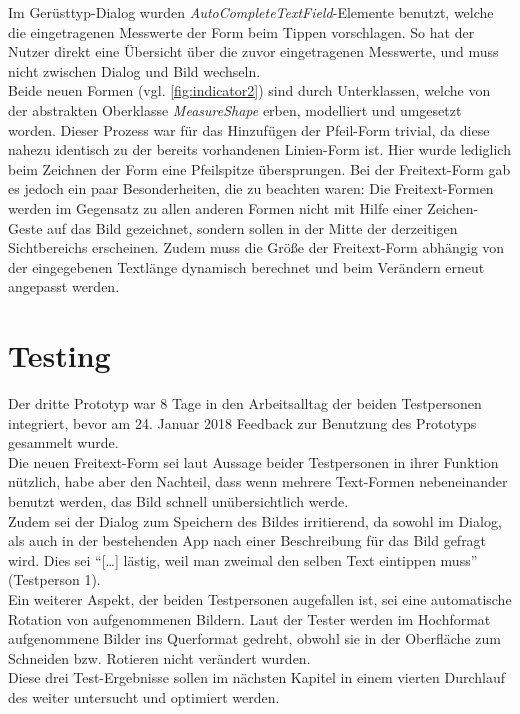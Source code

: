 Im Gerüsttyp-Dialog wurden \emph{AutoCompleteTextField}-Elemente benutzt, welche die eingetragenen Messwerte der Form beim Tippen vorschlagen.
So hat der Nutzer direkt eine Übersicht über die zuvor eingetragenen Messwerte, und muss nicht zwischen Dialog und Bild wechseln. \\

Beide neuen Formen (vgl. \autoref{fig:indicator2}) sind durch Unterklassen, welche von der abstrakten Oberklasse \emph{MeasureShape} erben, modelliert und umgesetzt worden.
Dieser Prozess war für das Hinzufügen der Pfeil-Form trivial, da diese nahezu identisch zu der bereits vorhandenen Linien-Form ist.
Hier wurde lediglich beim Zeichnen der Form eine Pfeilspitze übersprungen.
Bei der Freitext-Form gab es jedoch ein paar Besonderheiten, die zu beachten waren:
Die Freitext-Formen werden im Gegensatz zu allen anderen Formen nicht mit Hilfe einer Zeichen-Geste auf das Bild gezeichnet, sondern sollen in der Mitte der derzeitigen Sichtbereichs erscheinen.
Zudem muss die Größe der Freitext-Form abhängig von der eingegebenen Textlänge dynamisch berechnet und beim Verändern erneut angepasst werden. \\

\section{Testing}\label{sec:test3}
Der dritte Prototyp war 8 Tage in den Arbeitsalltag der beiden Testpersonen integriert, bevor am 24. Januar 2018 Feedback zur Benutzung des Prototyps gesammelt wurde. \\

Die neuen Freitext-Form sei laut Aussage beider Testpersonen in ihrer Funktion nützlich, habe aber den Nachteil, dass wenn mehrere Text-Formen nebeneinander benutzt werden, das Bild schnell unübersichtlich werde. \\

Zudem sei der Dialog zum Speichern des Bildes irritierend, da sowohl im Dialog, als auch in der bestehenden App nach einer Beschreibung für das Bild gefragt wird.
Dies sei ``[\dots] lästig, weil man zweimal den selben Text eintippen muss'' (Testperson 1). \\

Ein weiterer Aspekt, der beiden Testpersonen augefallen ist, sei eine automatische Rotation von aufgenommenen Bildern.
Laut der Tester werden im Hochformat aufgenommene Bilder ins Querformat gedreht, obwohl sie in der Oberfläche zum Schneiden bzw. Rotieren nicht verändert wurden. \\

Diese drei Test-Ergebnisse sollen im nächsten Kapitel in einem vierten Durchlauf des \hcdp{} weiter untersucht und optimiert werden.
